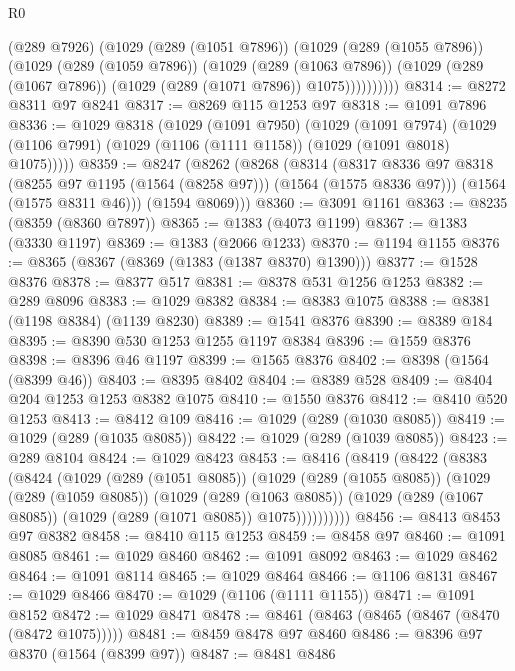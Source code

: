 \begin{lexlean}{R0}
\begin{coremodule}
            (@289 @7926)
            (@1029
              (@289 (@1051 @7896))
              (@1029
                (@289 (@1055 @7896))
                (@1029
                  (@289 (@1059 @7896))
                  (@1029
                    (@289 (@1063 @7896))
                    (@1029 (@289 (@1067 @7896)) (@1029 (@289 (@1071 @7896)) @1075))))))))))
@8314 := @8272 @8311 @97 @8241
@8317 := @8269 @115 @1253 @97
@8318 := @1091 @7896
@8336 := @1029
    @8318
    (@1029
      (@1091 @7950)
      (@1029
        (@1091 @7974)
        (@1029 (@1106 @7991) (@1029 (@1106 (@1111 @1158)) (@1029 (@1091 @8018) @1075)))))
@8359 := @8247
    (@8262
      (@8268
        (@8314
          (@8317 @8336 @97 @8318 (@8255 @97 @1195 (@1564 (@8258 @97))) (@1564 (@1575 @8336 @97)))
          (@1564 (@1575 @8311 @46)))
        (@1594 @8069)))
@8360 := @3091 @1161
@8363 := @8235 (@8359 (@8360 @7897))
@8365 := @1383 (@4073 @1199)
@8367 := @1383 (@3330 @1197)
@8369 := @1383 (@2066 @1233)
@8370 := @1194 @1155
@8376 := @8365 (@8367 (@8369 (@1383 (@1387 @8370) @1390)))
@8377 := @1528 @8376
@8378 := @8377 @517
@8381 := @8378 @531 @1256 @1253
@8382 := @289 @8096
@8383 := @1029 @8382
@8384 := @8383 @1075
@8388 := @8381 (@1198 @8384) (@1139 @8230)
@8389 := @1541 @8376
@8390 := @8389 @184
@8395 := @8390 @530 @1253 @1255 @1197 @8384
@8396 := @1559 @8376
@8398 := @8396 @46 @1197
@8399 := @1565 @8376
@8402 := @8398 (@1564 (@8399 @46))
@8403 := @8395 @8402
@8404 := @8389 @528
@8409 := @8404 @204 @1253 @1253 @8382 @1075
@8410 := @1550 @8376
@8412 := @8410 @520 @1253
@8413 := @8412 @109
@8416 := @1029 (@289 (@1030 @8085))
@8419 := @1029 (@289 (@1035 @8085))
@8422 := @1029 (@289 (@1039 @8085))
@8423 := @289 @8104
@8424 := @1029 @8423
@8453 := @8416
    (@8419
      (@8422
        (@8383
          (@8424
            (@1029
              (@289 (@1051 @8085))
              (@1029
                (@289 (@1055 @8085))
                (@1029
                  (@289 (@1059 @8085))
                  (@1029
                    (@289 (@1063 @8085))
                    (@1029 (@289 (@1067 @8085)) (@1029 (@289 (@1071 @8085)) @1075))))))))))
@8456 := @8413 @8453 @97 @8382
@8458 := @8410 @115 @1253
@8459 := @8458 @97
@8460 := @1091 @8085
@8461 := @1029 @8460
@8462 := @1091 @8092
@8463 := @1029 @8462
@8464 := @1091 @8114
@8465 := @1029 @8464
@8466 := @1106 @8131
@8467 := @1029 @8466
@8470 := @1029 (@1106 (@1111 @1155))
@8471 := @1091 @8152
@8472 := @1029 @8471
@8478 := @8461 (@8463 (@8465 (@8467 (@8470 (@8472 @1075)))))
@8481 := @8459 @8478 @97 @8460
@8486 := @8396 @97 @8370 (@1564 (@8399 @97))
@8487 := @8481 @8486

\end{coremodule}
\end{lexlean}
